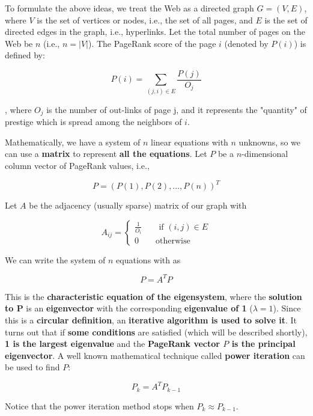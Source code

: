 To formulate the above ideas, we treat the Web as a directed graph $G =
(V, E)$, where $V$ is the set of vertices or nodes, i.e., the set of all pages, and $E$ is the set of directed edges in the graph, i.e., hyperlinks. Let the total number of pages on the Web be $n$ (i.e., $n = |V|$). The PageRank score of the page $i$ (denoted by $P(i)$) is defined by:

\begin{equation}\label{PageRank}
    P(i) = \sum_{(j,i) \in E} \frac{P(j)}{O_j}
\end{equation}

, where $O_j$ is the number of out-links of page j, and it represents the "quantity" of prestige which is spread among the neighbors of $i$.

Mathematically, we have a system of $n$ linear equations with $n$ unknowns, so we can use a \textbf{matrix} to represent \textbf{all the equations}. Let $P$ be a $n$-dimensional column vector of PageRank values, i.e., 

$$
P = (P(1), P(2), …, P(n))^T
$$

Let $A$ be the adjacency (usually sparse) matrix of our graph with

$$
A_{ij} = \begin{cases}
    \frac{1}{O_i} \qquad \text{if } (i,j) \in E \\
    0 \qquad \text{otherwise}
\end{cases}
$$

We can write the system of $n$ equations with as

\begin{equation}\label{PageRank matrix}
    P = A^T P
\end{equation}

This is the \textbf{characteristic equation of the eigensystem}, where the \textbf{solution to P} is an \textbf{eigenvector} with the corresponding \textbf{eigenvalue of 1} ($\lambda = 1$). Since this is a \textbf{circular definition}, an \textbf{iterative algorithm is used to solve it}. It turns out that if \textbf{some conditions} are satisfied (which will be described shortly), \textbf{1 is the largest eigenvalue} and the \textbf{PageRank vector $P$ is the principal eigenvector}. A well known mathematical technique called \textbf{power iteration} can be used to find $P$:

$$
P_k = A^T P_{k-1}
$$

Notice that the power iteration method stops when $P_k \approx P_{k-1}$. 

